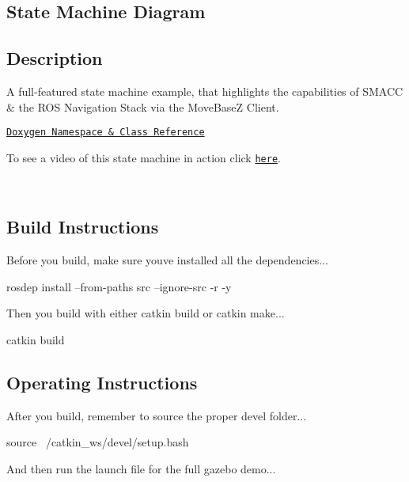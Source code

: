 \subsection*{State Machine Diagram}



\subsection*{Description}

A full-\/featured state machine example, that highlights the capabilities of S\+M\+A\+CC \& the R\+OS Navigation Stack via the Move\+BaseZ Client.~\newline


\href{https://reelrbtx.github.io/SMACC_Documentation/master/html/namespacesm__dance__bot.html}{\tt Doxygen Namespace \& Class Reference}

To see a video of this state machine in action click \href{https://www.youtube.com/watch?v=9iyX_x05d3Q&t=7s}{\tt here}.

 

~\newline


\subsection*{Build Instructions}

Before you build, make sure you\textquotesingle{}ve installed all the dependencies...


\begin{DoxyCode}
rosdep install --from-paths src --ignore-src -r -y 
\end{DoxyCode}


Then you build with either catkin build or catkin make...


\begin{DoxyCode}
catkin build
\end{DoxyCode}
 \subsection*{Operating Instructions}

After you build, remember to source the proper devel folder...


\begin{DoxyCode}
source ~/catkin\_ws/devel/setup.bash
\end{DoxyCode}


And then run the launch file for the full gazebo demo...



